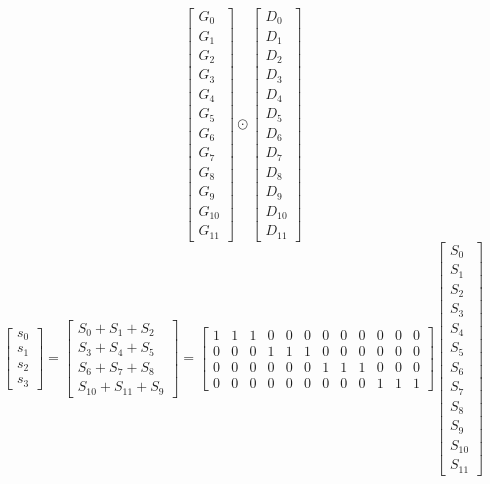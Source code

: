 \documentclass{article}%
\begin{document}
\[\left[\begin{matrix}G_{0}\\G_{1}\\G_{2}\\G_{3}\\G_{4}\\G_{5}\\G_{6}\\G_{7}\\G_{8}\\G_{9}\\G_{10}\\G_{11}\end{matrix}\right] \odot \left[\begin{matrix}D_{0}\\D_{1}\\D_{2}\\D_{3}\\D_{4}\\D_{5}\\D_{6}\\D_{7}\\D_{8}\\D_{9}\\D_{10}\\D_{11}\end{matrix}\right]%
\]%
\[%
\left[\begin{matrix}s_{0}\\s_{1}\\s_{2}\\s_{3}\end{matrix}\right] = \left[\begin{matrix}S_{0} + S_{1} + S_{2}\\S_{3} + S_{4} + S_{5}\\S_{6} + S_{7} + S_{8}\\S_{10} + S_{11} + S_{9}\end{matrix}\right] = \left[\begin{array}{cccccccccccc}1 & 1 & 1 & 0 & 0 & 0 & 0 & 0 & 0 & 0 & 0 & 0\\0 & 0 & 0 & 1 & 1 & 1 & 0 & 0 & 0 & 0 & 0 & 0\\0 & 0 & 0 & 0 & 0 & 0 & 1 & 1 & 1 & 0 & 0 & 0\\0 & 0 & 0 & 0 & 0 & 0 & 0 & 0 & 0 & 1 & 1 & 1\end{array}\right] \left[\begin{matrix}S_{0}\\S_{1}\\S_{2}\\S_{3}\\S_{4}\\S_{5}\\S_{6}\\S_{7}\\S_{8}\\S_{9}\\S_{10}\\S_{11}\end{matrix}\right]%
\]%
\end{document}
